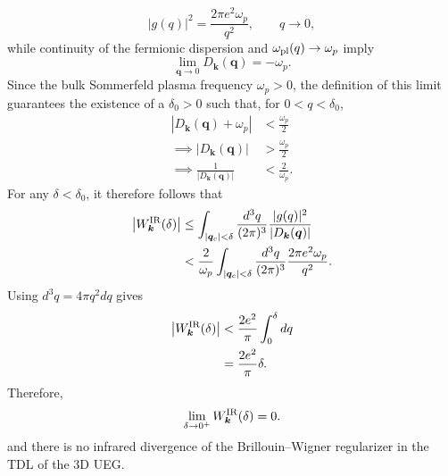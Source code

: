\begin{equation}
|g(q)|^2
=
\frac{2\pi e^2\omega_p}{q^2},
\qquad q\rightarrow0,
\end{equation}
while continuity of the fermionic dispersion and
$\omega_{\rm pl}(q)\rightarrow\omega_p$ imply
\begin{equation}
\lim_{\bm q\rightarrow0}
D_{\bm k}(\bm q)
=
-\omega_p.
\end{equation}
Since the bulk Sommerfeld plasma frequency $\omega_p>0$, the definition of this limit guarantees the
existence of a $\delta_0>0$ such that, for
$0<q<\delta_0$,
\begin{align}
\left|
D_{\bm k}(\bm q)+\omega_p
\right|
&<
\frac{\omega_p}{2}\\
\implies 
|D_{\bm k}(\bm q)|
&>
\frac{\omega_p}{2}\\
\implies
\frac{1}{|D_{\bm k}(\bm q)|}
&<
\frac{2}{\omega_p}.
\end{align}
For any $\delta<\delta_0$, it therefore follows that
\begin{align}
\left|W_{\bm k}^{\rm IR}(\delta)\right|
&\leq
\int_{|\bm q_c|<\delta}
\frac{d^3q}{(2\pi)^3}
\frac{|g(q)|^2}{|D_{\bm k}(\bm q)|}
\\
&<
\frac{2}{\omega_p}
\int_{|\bm q_c|<\delta}
\frac{d^3q}{(2\pi)^3}
\frac{2\pi e^2\omega_p}{q^2}.
\end{align}
Using $d^3q=4\pi q^2dq$ gives
\begin{align}
\left|W_{\bm k}^{\rm IR}(\delta)\right|
&<
\frac{2e^2}{\pi}
\int_0^\delta dq
\\
&=
\frac{2e^2}{\pi}\delta.
\end{align}
Therefore,
\begin{equation}
{
\lim_{\delta\rightarrow0^+}
W_{\bm k}^{\rm IR}(\delta)=0.
}
\end{equation}
and there is no infrared
divergence of the Brillouin--Wigner regularizer in the TDL of the 3D UEG.


